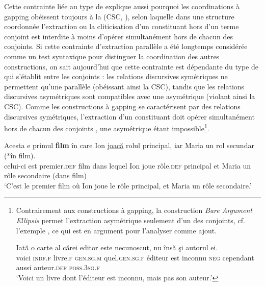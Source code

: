 \largerpage 
Cette contrainte liée au type de  explique aussi pourquoi les coordinations à gapping obéissent toujours à la  (CSC, \citealt{Ross1967}), selon laquelle dans une structure coordonnée l’extraction ou la cliticisation d’un constituant hors d’un terme conjoint est interdite à moins d’opérer simultanément hors de chacun des conjoints. Si cette contrainte d’extraction parallèle a été longtemps considérée comme un test syntaxique pour distinguer la coordination des autres constructions, on sait aujourd’hui que cette contrainte est dépendante du type de  qui s’établit entre les conjoints \citep{Lakoff1986,Kehler2002,KubotaEtAl2008} : les relations discursives symétriques ne permettent qu’une  parallèle (obéissant ainsi la CSC), tandis que les relations discursives asymétriques sont compatibles avec une  asymétrique (violant ainsi la CSC). Comme les constructions à gapping se caractérisent par des relations discursives symétriques, l’extraction d’un constituant doit opérer simultanément hors de chacun des conjoints , une  asymétrique étant impossible\footnote{
 Contrairement aux constructions à gapping, la construction \textit{Bare Argument Ellipsis} permet l’extraction asymétrique seulement d’un des conjoints, cf. l’exemple , ce qui est en argument pour l’analyser comme ajout.
 
\ea \label{ch2:foot54i}
\gll Iată  o  carte  al  cărei  editor  este  necunoscut,  nu  însă  şi  autorul  ei.\\
voici  \textsc{indf.f}  livre.\textsc{f}  \textsc{gen.sg.m} quel.\textsc{gen.sg.f} éditeur  est  inconnu  \textsc{neg}  cependant  aussi  auteur.\textsc{def} \textsc{poss.3sg.f}\\
\glt ‘Voici un livre dont l’éditeur est inconnu, mais pas son auteur.’
\z
}. 

\ea \label{ch2:ex166}
\ea 
\gll Acesta  e  primul  \textbf{film}  în  care  Ion  \uline{joacă}  rolul  principal,  iar Maria  un  rol  secundar  (*în  film).\\ 
celui-ci  est  premier.\textsc{def}  film  dans  lequel  Ion  joue  rôle.\textsc{def}  principal et Maria  un  rôle  secondaire  (dans  film)\\
\glt ‘C’est le premier film où Ion joue le rôle principal, et Maria un rôle secondaire.’  


